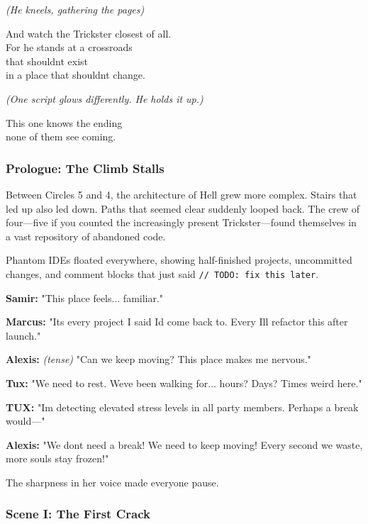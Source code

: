 \emph{(He kneels, gathering the pages)}

And watch the Trickster closest of all.\\
For he stands at a crossroads\\
that shouldn\textquotesingle t exist\\
in a place that shouldn\textquotesingle t change.

\emph{(One script glows differently. He holds it up.)}

This one knows the ending\\
none of them see coming.

\bookdivider

\subsubsection{Prologue: The Climb Stalls}\label{prologue-the-climb-stalls}

Between Circles 5 and 4, the architecture of Hell grew more complex. Stairs that led up also led down. Paths that seemed clear suddenly looped back. The crew of four---five if you counted the increasingly present Trickster---found themselves in a vast repository of abandoned code.

Phantom IDEs floated everywhere, showing half-finished projects, uncommitted changes, and comment blocks that just said \texttt{//\ TODO:\ fix\ this\ later}.

\textbf{Samir:} "This place feels... familiar."

\textbf{Marcus:} "It\textquotesingle s every project I said I\textquotesingle d come back to. Every \textquotesingle I\textquotesingle ll refactor this after launch.\textquotesingle"

\textbf{Alexis:} \emph{(tense)} "Can we keep moving? This place makes me nervous."

\textbf{Tux:} "We need to rest. We\textquotesingle ve been walking for... hours? Days? Time\textquotesingle s weird here."

\textbf{TUX:} "I\textquotesingle m detecting elevated stress levels in all party members. Perhaps a break would---"

\textbf{Alexis:} "We don\textquotesingle t need a break! We need to keep moving! Every second we waste, more souls stay frozen!"

The sharpness in her voice made everyone pause.

\bookdivider

\subsubsection{Scene I: The First Crack}\label{scene-i-the-first-crack}

